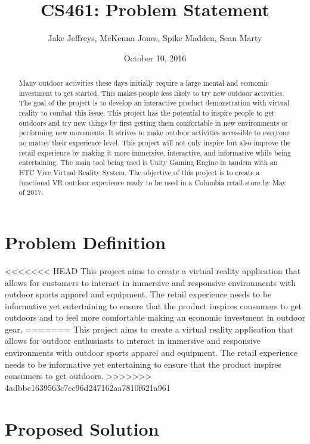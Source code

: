 \documentclass[letterpaper,10pt,titlepage]{article}
\title{CS461: Problem Statement}
\author{Jake Jeffreys, McKenna Jones, Spike Madden, Sean Marty}
\date{October 10, 2016}
\begin{document}
\begin{titlepage}
\maketitle
\begin{abstract}
Many outdoor activities these days initially require a large mental and economic
investment to get started. This makes people less likely to try new outdoor
activities. The goal of the project is to develop an interactive product
demonstration with virtual reality to combat this issue. This project has the
potential to inspire people to get outdoors and try new things by first getting
them comfortable in new environments or performing new movements. It strives to
make outdoor activities accessible to everyone no matter their experience level.
This project will not only inspire but also improve the retail experience by
making it more immersive, interactive, and informative while being
entertaining. The main tool being used is Unity Gaming Engine in tandem with an
HTC Vive Virtual Reality System. The objective of this project is to create a
functional VR outdoor experience ready to be used in a Columbia retail store by
May of 2017.
\end{abstract}
\end{titlepage}

\section{Problem Definition}
<<<<<<< HEAD
This project aims to create a virtual reality application that allows for customers to interact in immersive and responsive environments with outdoor sports apparel and equipment. The retail experience needs to be informative yet entertaining to ensure that the product inspires consumers to get outdoors and to feel more comfortable making an economic investment in outdoor gear.
=======
This project aims to create a virtual reality application that allows for
outdoor enthusiasts to interact in immersive and responsive environments with
outdoor sports apparel and equipment. The retail experience needs to be
informative yet entertaining to ensure that the product inspires consumers to
get outdoors.
>>>>>>> 4adbbc1639563c7cc96d247162aa7810f621a961

\section{Proposed Solution}
\end{document}
